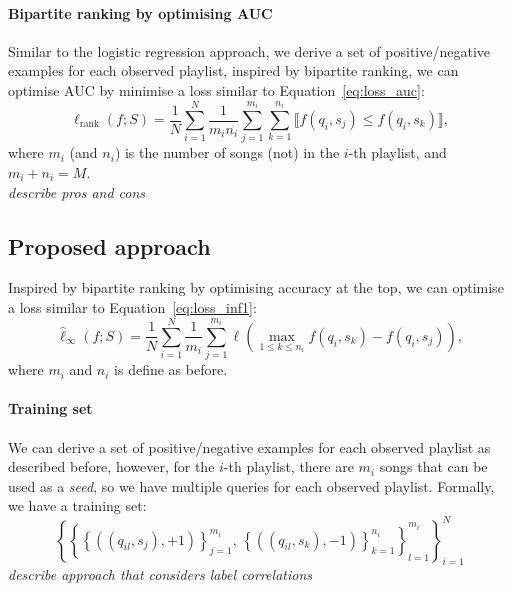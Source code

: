 \documentclass[9pt]{extarticle}
\newcommand{\llb}{\llbracket}
\newcommand{\rrb}{\rrbracket}
\newcommand{\1}{\mathbf{1}}
\begin{document}
{\paragraph{Bipartite ranking by optimising AUC}
Similar to the logistic regression approach, we derive a set of positive/negative examples for each observed playlist, 
inspired by bipartite ranking, we can optimise AUC by minimise a loss similar to Equation~\ref{eq:loss_auc}:
\begin{equation}
\label{eq:loss_auc_pl}
\ell_\text{rank}(f; S) = \frac{1}{N} \sum_{i=1}^N \frac{1}{m_i n_i} \sum_{j=1}^{m_i} \sum_{k=1}^{n_i} \llb f(q_i, s_j) \le f(q_i, s_k) \rrb,
\end{equation}
where $m_i$ (and $n_i$) is the number of songs (not) in the $i$-th playlist, and $m_i + n_i = M$.
\\ \emph{describe pros and cons}

\subsection{Proposed approach}
Inspired by bipartite ranking by optimising accuracy at the top, we can optimise a loss similar to Equation~\ref{eq:loss_inf1}:
\begin{equation}
\label{eq:loss_inf_pl}
\hat{\ell}_{\infty}(f; S) = \frac{1}{N} \sum_{i=1}^N \frac{1}{m_i} \sum_{j=1}^{m_i} \ell\left( \max_{1 \le k \le n_i} f(q_i, s_k) - f(q_i, s_j) \right),
\end{equation}
where $m_i$ and $n_i$ is define as before.

\paragraph{Training set}
We can derive a set of positive/negative examples for each observed playlist as described before, however,
for the $i$-th playlist, there are $m_i$ songs that can be used as a \emph{seed}, so we have multiple queries for each observed playlist.
Formally, we have a training set:
\begin{equation*}
\left\{ \left\{ 
        \left\{\left((q_{il}, s_j), +1\right) \right\}_{j=1}^{m_i}, \,
        \left\{\left((q_{il}, s_k), -1\right) \right\}_{k=1}^{n_i}  \right\}_{l=1}^{m_i} \right\}_{i=1}^N
\end{equation*}
\emph{describe approach that considers label correlations}

}
\end{document}
